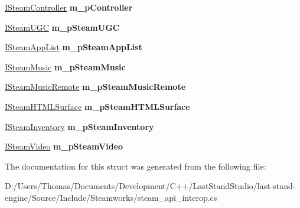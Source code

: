 \begin{DoxyCompactItemize}
\item 
\hypertarget{structValve_1_1Steamworks_1_1CSteamAPIContext_a57bf4e02aae07a3b425fbe14e7293013}{}\hyperlink{classValve_1_1Steamworks_1_1ISteamController}{I\+Steam\+Controller} {\bfseries m\+\_\+p\+Controller}\label{structValve_1_1Steamworks_1_1CSteamAPIContext_a57bf4e02aae07a3b425fbe14e7293013}

\item 
\hypertarget{structValve_1_1Steamworks_1_1CSteamAPIContext_a62bb3c7a254d62ea77a083e70b60b622}{}\hyperlink{classValve_1_1Steamworks_1_1ISteamUGC}{I\+Steam\+U\+G\+C} {\bfseries m\+\_\+p\+Steam\+U\+G\+C}\label{structValve_1_1Steamworks_1_1CSteamAPIContext_a62bb3c7a254d62ea77a083e70b60b622}

\item 
\hypertarget{structValve_1_1Steamworks_1_1CSteamAPIContext_a050427c090d1e04eaa22751e1c667f30}{}\hyperlink{classValve_1_1Steamworks_1_1ISteamAppList}{I\+Steam\+App\+List} {\bfseries m\+\_\+p\+Steam\+App\+List}\label{structValve_1_1Steamworks_1_1CSteamAPIContext_a050427c090d1e04eaa22751e1c667f30}

\item 
\hypertarget{structValve_1_1Steamworks_1_1CSteamAPIContext_ae0d1410d0494c3181e43c2f689c5644f}{}\hyperlink{classValve_1_1Steamworks_1_1ISteamMusic}{I\+Steam\+Music} {\bfseries m\+\_\+p\+Steam\+Music}\label{structValve_1_1Steamworks_1_1CSteamAPIContext_ae0d1410d0494c3181e43c2f689c5644f}

\item 
\hypertarget{structValve_1_1Steamworks_1_1CSteamAPIContext_a8f691bd38e5ced3198e849c4d809b511}{}\hyperlink{classValve_1_1Steamworks_1_1ISteamMusicRemote}{I\+Steam\+Music\+Remote} {\bfseries m\+\_\+p\+Steam\+Music\+Remote}\label{structValve_1_1Steamworks_1_1CSteamAPIContext_a8f691bd38e5ced3198e849c4d809b511}

\item 
\hypertarget{structValve_1_1Steamworks_1_1CSteamAPIContext_a3d4c658c371663eebac58de9c13f06e6}{}\hyperlink{classValve_1_1Steamworks_1_1ISteamHTMLSurface}{I\+Steam\+H\+T\+M\+L\+Surface} {\bfseries m\+\_\+p\+Steam\+H\+T\+M\+L\+Surface}\label{structValve_1_1Steamworks_1_1CSteamAPIContext_a3d4c658c371663eebac58de9c13f06e6}

\item 
\hypertarget{structValve_1_1Steamworks_1_1CSteamAPIContext_a48c0204b0dd38397e5a52ddcedbe7df4}{}\hyperlink{classValve_1_1Steamworks_1_1ISteamInventory}{I\+Steam\+Inventory} {\bfseries m\+\_\+p\+Steam\+Inventory}\label{structValve_1_1Steamworks_1_1CSteamAPIContext_a48c0204b0dd38397e5a52ddcedbe7df4}

\item 
\hypertarget{structValve_1_1Steamworks_1_1CSteamAPIContext_adc0ee3cc0f6a0795a716304c92cd7c68}{}\hyperlink{classValve_1_1Steamworks_1_1ISteamVideo}{I\+Steam\+Video} {\bfseries m\+\_\+p\+Steam\+Video}\label{structValve_1_1Steamworks_1_1CSteamAPIContext_adc0ee3cc0f6a0795a716304c92cd7c68}

\end{DoxyCompactItemize}


The documentation for this struct was generated from the following file\+:\begin{DoxyCompactItemize}
\item 
D\+:/\+Users/\+Thomas/\+Documents/\+Development/\+C++/\+Last\+Stand\+Studio/last-\/stand-\/engine/\+Source/\+Include/\+Steamworks/steam\+\_\+api\+\_\+interop.\+cs\end{DoxyCompactItemize}
